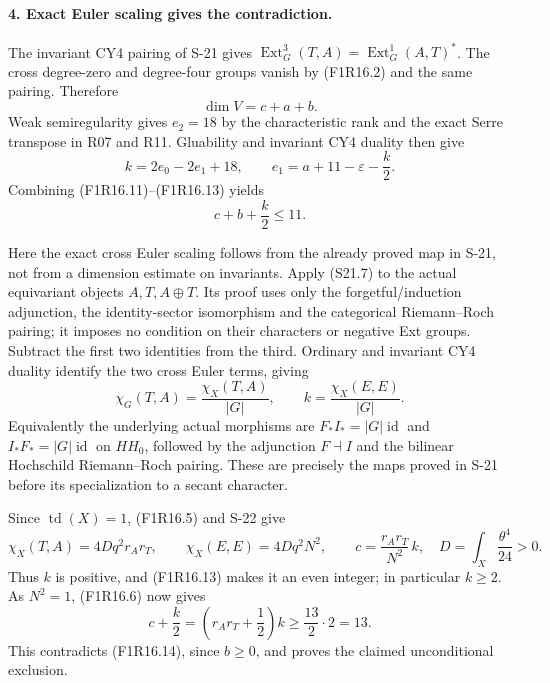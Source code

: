 \paragraph{4. Exact Euler scaling gives the contradiction.}
The invariant CY4 pairing of S-21 gives
$\operatorname{Ext}^3_G(T,A)=\operatorname{Ext}^1_G(A,T)^*$.
The cross degree-zero and degree-four groups vanish by
(F1R16.2) and the same pairing. Therefore
\[
                             \dim V=c+a+b.
 \tag{F1R16.12}
\]
Weak semiregularity gives $e_2=18$ by the characteristic
rank and the exact Serre transpose in R07 and R11.
Gluability and invariant CY4 duality then give
\[
 k=2e_0-2e_1+18,
 \qquad
 e_1=a+11-\varepsilon-\frac{k}{2}.
 \tag{F1R16.13}
\]
Combining (F1R16.11)--(F1R16.13) yields
\[
                              c+b+\frac{k}{2}\le11.
 \tag{F1R16.14}
\]

Here the exact cross Euler scaling follows from the
already proved map in S-21, not from a dimension estimate
on invariants. Apply (S21.7) to the actual equivariant
objects $A,T,A\oplus T$. Its proof uses only the
forgetful/induction adjunction, the identity-sector
isomorphism and the categorical Riemann--Roch pairing;
it imposes no condition on their characters or negative
Ext groups. Subtract the first two identities from the
third. Ordinary and invariant CY4 duality identify the
two cross Euler terms, giving
\[
          \chi_G(T,A)=\frac{\chi_X(T,A)}{|G|},
          \qquad
          k=\frac{\chi_X(E,E)}{|G|}.
 \tag{F1R16.15}
\]
Equivalently the underlying actual morphisms are
$F_*I_*=|G|\operatorname{id}$ and
$I_*F_*=|G|\operatorname{id}$ on $HH_0$, followed by
the adjunction $F\dashv I$ and the bilinear Hochschild
Riemann--Roch pairing. These are precisely the maps
proved in S-21 before its specialization to a secant
character.

Since $\operatorname{td}(X)=1$, (F1R16.5) and S-22 give
\[
 \chi_X(T,A)=4Dq^2r_A r_T,\qquad
 \chi_X(E,E)=4Dq^2N^2,
 \qquad c=\frac{r_A r_T}{N^2}\,k,
 \quad D=\int_X\frac{\theta^4}{24}>0.
 \tag{F1R16.16}
\]
Thus $k$ is positive, and (F1R16.13) makes it an even
integer; in particular $k\ge2$. As $N^2=1$, (F1R16.6)
now gives
\[
             c+\frac{k}{2}
             =\left(r_A r_T+\frac12\right)k
             \ge\frac{13}{2}\cdot2=13.
 \tag{F1R16.17}
\]
This contradicts (F1R16.14), since $b\ge0$, and proves
the claimed unconditional exclusion.

